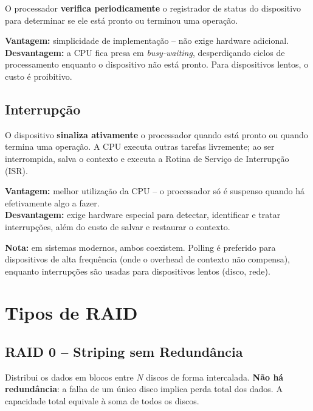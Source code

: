 \documentclass[12pt, a4paper]{article}
\begin{document}
O processador \textbf{verifica periodicamente} o registrador de status do dispositivo
para determinar se ele está pronto ou terminou uma operação.

\begin{caixaamarela}
  \textbf{Vantagem:} simplicidade de implementação -- não exige hardware adicional.\\
  \textbf{Desvantagem:} a CPU fica presa em \emph{busy-waiting}, desperdiçando ciclos
  de processamento enquanto o dispositivo não está pronto. Para dispositivos lentos,
  o custo é proibitivo.
\end{caixaamarela}

\subsection{Interrupção}

O dispositivo \textbf{sinaliza ativamente} o processador quando está pronto ou quando
termina uma operação. A CPU executa outras tarefas livremente; ao ser interrompida,
salva o contexto e executa a Rotina de Serviço de Interrupção (ISR).

\begin{caixaamarela}
  \textbf{Vantagem:} melhor utilização da CPU -- o processador só é suspenso quando há
  efetivamente algo a fazer.\\
  \textbf{Desvantagem:} exige hardware especial para detectar, identificar e tratar
  interrupções, além do custo de salvar e restaurar o contexto.
\end{caixaamarela}

\begin{caixaverde}
  \textbf{Nota:} em sistemas modernos, ambos coexistem. Polling é preferido para
  dispositivos de alta frequência (onde o overhead de contexto não compensa),
  enquanto interrupções são usadas para dispositivos lentos (disco, rede).
\end{caixaverde}

\section{Tipos de RAID}

\subsection{RAID 0 -- Striping sem Redundância}

Distribui os dados em blocos entre $N$ discos de forma intercalada.
\textbf{Não há redundância}: a falha de um único disco implica perda total dos dados.
A capacidade total equivale à soma de todos os discos.
\end{document}
